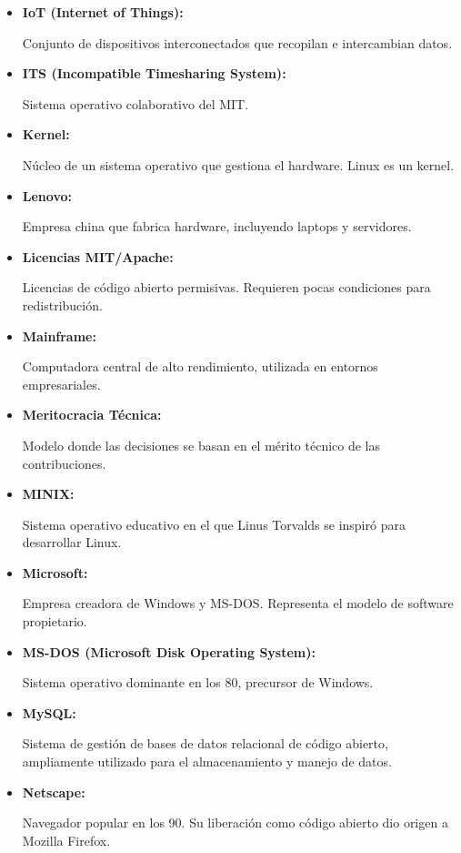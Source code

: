 \documentclass[a4paper,12pt]{article}
\begin{document}
\begin{itemize}
\item \hypertarget{iot}{\textbf{IoT (Internet of Things):}} Conjunto de
dispositivos interconectados que recopilan e intercambian datos.  \label{iot}

\item \hypertarget{its}{\textbf{ITS (Incompatible Timesharing System):}} Sistema
operativo colaborativo del MIT.  \label{its}

\item \hypertarget{kernel}{\textbf{Kernel:}} Núcleo de un sistema operativo que
gestiona el hardware. Linux es un kernel.  \label{kernel}

\item \hypertarget{lenovo}{\textbf{Lenovo:}} Empresa china que fabrica hardware,
incluyendo laptops y servidores.  \label{lenovo}

\item \hypertarget{licencias mit/apache}{\textbf{Licencias MIT/Apache:}}
Licencias de código abierto permisivas. Requieren pocas condiciones para
redistribución.  \label{mitapache}

\item \hypertarget{mainframe}{\textbf{Mainframe:}} Computadora central de alto
rendimiento, utilizada en entornos empresariales.  \label{mainframe}

\item \hypertarget{meritocracia}{\textbf{Meritocracia Técnica:}} Modelo donde
las decisiones se basan en el mérito técnico de las contribuciones.
\label{meritocracia}

\item \hypertarget{minix}{\textbf{MINIX:}} Sistema operativo educativo en el que
Linus Torvalds se inspiró para desarrollar Linux.  \label{minix}

\item \hypertarget{microsoft}{\textbf{Microsoft:}} Empresa creadora de Windows y
MS-DOS. Representa el modelo de software propietario.  \label{microsoft}

\item \hypertarget{msdos}{\textbf{MS-DOS (Microsoft Disk Operating System):}}
Sistema operativo dominante en los 80, precursor de Windows.  \label{msdos}

\item \hypertarget{mysql}{\textbf{MySQL:}} Sistema de gestión de bases de datos
relacional de código abierto, ampliamente utilizado para el almacenamiento y
manejo de datos. 

\item \hypertarget{netscape}{\textbf{Netscape:}} Navegador popular en los 90. Su
liberación como código abierto dio origen a Mozilla Firefox.  \label{netscape}


\end{itemize}
\end{document}
